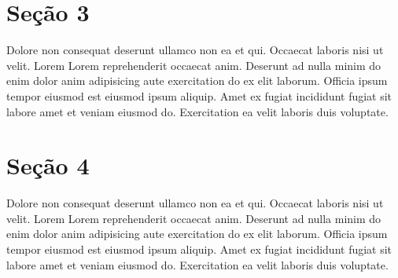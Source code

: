 \documentclass[12pt]{report}
\begin{document}
\section{Seção 3}

Dolore non consequat deserunt ullamco non ea et qui. Occaecat laboris nisi ut velit. Lorem Lorem reprehenderit occaecat anim. Deserunt ad nulla minim do enim dolor anim adipisicing aute exercitation do ex elit laborum. Officia ipsum tempor eiusmod est eiusmod ipsum aliquip. Amet ex fugiat incididunt fugiat sit labore amet et veniam eiusmod do. Exercitation ea velit laboris duis voluptate.

\section{Seção 4}

Dolore non consequat deserunt ullamco non ea et qui. Occaecat laboris nisi ut velit. Lorem Lorem reprehenderit occaecat anim. Deserunt ad nulla minim do enim dolor anim adipisicing aute exercitation do ex elit laborum. Officia ipsum tempor eiusmod est eiusmod ipsum aliquip. Amet ex fugiat incididunt fugiat sit labore amet et veniam eiusmod do. Exercitation ea velit laboris duis voluptate. 
\end{document}
